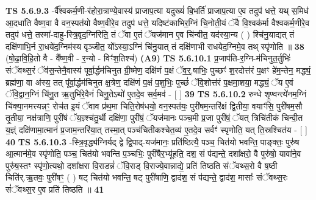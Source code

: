 \documentclass[17pt]{extarticle}
\begin{document}
                  \newline
                                \textbf{ TS 5.6.9.3} \newline
                  -र्वै᳚श्वकर्म॒णी-र॑होरा॒त्राण्ये॒वास्य॑ प्राजाप॒त्या यदुख्यं॑ बि॒भर्ति॑ प्राजाप॒त्या ए॒व तदुप॑ धत्ते॒ यथ् स॒मिध॑ आ॒दधा॑ति वैष्ण॒वा वै वन॒स्पत॑यो वैष्ण॒वीरे॒व तदुप॑ धत्ते॒ यदिष्ट॑काभिर॒ग्निं चि॒नोती॒यं ॅवै वि॒श्वक॑र्मा वैश्वकर्म॒णीरे॒व तदुप॑ धत्ते॒ तस्मा॑-दाहु-स्त्रि॒वृद॒ग्निरिति॒ तं ॅवा ए॒तं ॅयज॑मान ए॒व चि॑न्वीत॒ यद॑स्या॒न्य ( ) श्चि॑नु॒याद्यत् तं दक्षि॑णाभि॒र्न रा॒धये॑द॒ग्निम॑स्य वृञ्जीत॒ यो᳚ऽस्या॒ऽग्निं चि॑नु॒यात् तं दक्षि॑णाभी राधयेद॒ग्निमे॒व तथ् स्पृ॑णोति ॥ \textbf{  38} \newline
                  \newline
                      (षो॒ढा॒वि॒हि॒तो वै - वै᳚ष्ण॒वी - र॒न्यो - विꣳ॑श॒तिश्च॑)  \textbf{(A9)} \newline \newline
                                        \textbf{ TS 5.6.10.1} \newline
                  प्र॒जाप॑ति-र॒ग्नि-म॑चिनुत॒र्तुभिः॑ संॅवथ्स॒रं ॅव॑स॒न्तेनै॒वास्य॑ पूर्वा॒र्द्धम॑चिनुत ग्री॒ष्मेण॒ दक्षि॑णं प॒क्षं ॅव॒र्॒.षाभिः॒ पुच्छꣳ॑ श॒रदोत्त॑रं प॒क्षꣳ हे॑म॒न्तेन॒ मद्ध्यं॒ ब्रह्म॑णा॒ वा अ॑स्य॒ तत् पू᳚र्वा॒र्द्धम॑चिनुत क्ष॒त्रेण॒ दक्षि॑णं प॒क्षं प॒शुभिः॒ पुच्छं॑ ॅवि॒शोत्त॑रं प॒क्षमा॒शया॒ मद्ध्यं॒ ॅय ए॒वं ॅवि॒द्वान॒ग्निं चि॑नु॒त ऋ॒तुभि॑रे॒वैनं॑ चिनु॒तेऽथो॑ ए॒तदे॒व सर्व॒मव॑ - [  ] \textbf{  39} \newline
                  \newline
                                \textbf{ TS 5.6.10.2} \newline
                  रुन्धे शृ॒ण्वन्त्ये॑नम॒ग्निं चि॑क्या॒नमत्त्यन्नꣳ॒॒ रोच॑त इ॒यं ॅवाव प्र॑थ॒मा चिति॒रोष॑धयो॒ वन॒स्पत॑यः॒ पुरी॑षम॒न्तरि॑क्षं द्वि॒तीया॒ वयाꣳ॑सि॒ पुरी॑षम॒सौ तृ॒तीया॒ नक्ष॑त्राणि॒ पुरी॑षं ॅय॒ज्ञ्श्च॑तु॒र्थी दक्षि॑णा॒ पुरी॑षं॒ ॅयज॑मानः पञ्च॒मी प्र॒जा पुरी॑षं॒ ॅयत् त्रिचि॑तीकं चिन्वी॒त य॒ज्ञ्ं दक्षि॑णामा॒त्मानं॑ प्र॒जाम॒न्तरि॑या॒त् तस्मा॒त् पञ्च॑चितीकश्चेत॒व्य॑ ए॒तदे॒व सर्वꣳ॑ स्पृणोति॒ यत् ति॒स्रश्चित॑य - [  ] \textbf{  40} \newline
                  \newline
                                \textbf{ TS 5.6.10.3} \newline
                  -स्त्रि॒वृद्ध्य॑ग्निर्यद् द्वे द्वि॒पाद्-यज॑मानः॒ प्रति॑ष्ठित्यै॒ पञ्च॒ चित॑यो भवन्ति॒ पाङ्क्तः॒ पुरु॑ष आ॒त्मान॑मे॒व स्पृ॑णोति॒ पञ्च॒ चित॑यो भवन्ति प॒ञ्चभिः॒ पुरी॑षैर॒भ्यू॑हति॒ दश॒ सं प॑द्यन्ते॒ दशा᳚क्षरो॒ वै पुरु॑षो॒ यावा॑ने॒व पुरु॑ष॒स्तꣳ स्पृ॑णो॒त्यथो॒ दशा᳚क्षरा वि॒राडन्नं॑ ॅवि॒राड् वि॒राज्ये॒वान्नाद्ये॒ प्रति॑ तिष्ठति संॅवथ्स॒रो वै ष॒ष्ठी चिति॑र्.ऋ॒तवः॒ पुरी॑षꣳ॒॒ ( ) षट् चित॑यो भवन्ति॒ षट् पुरी॑षाणि॒ द्वाद॑श॒ सं प॑द्यन्ते॒ द्वाद॑श॒ मासाः᳚ संॅवथ्स॒रः सं॑ॅवथ्स॒र ए॒व प्रति॑ तिष्ठति ॥ \textbf{  41} \newline
\end{document}
